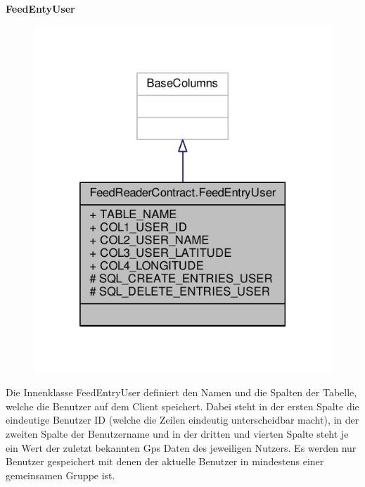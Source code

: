 \textbf{FeedEntyUser}
\begin{figure}[H]
	\includegraphics[scale = 1]{res/umlClasses/feed_reader_contract_user.pdf}
	\centering
\end{figure}
Die Innenklasse FeedEntryUser definiert den Namen und die Spalten der Tabelle, welche die Benutzer auf dem Client speichert. 
Dabei steht in der ersten Spalte die eindeutige Benutzer ID (welche die Zeilen eindeutig unterscheidbar macht), in der zweiten Spalte der Benutzername und in der dritten und vierten Spalte steht je ein Wert der zuletzt bekannten Gps Daten des jeweiligen Nutzers. 
Es werden nur Benutzer gespeichert mit denen der aktuelle Benutzer in mindestens einer gemeinsamen Gruppe ist.

